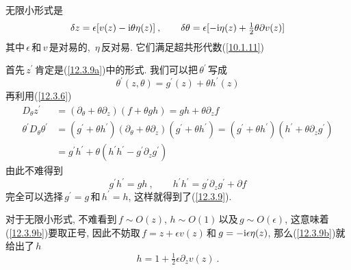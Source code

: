 无限小形式是
\begin{equation}
    \delta z= \epsilon[v(z)-\mathrm{i}\theta\eta(z)] \:, \qquad 
    \delta \theta =\epsilon[-\mathrm{i}\eta(z)+\tfrac{1}{2}\theta\partial v(z)]  \label{12.3.10}
\end{equation}
其中$\,\epsilon\,$和$\,v\,$是对易的, $\,\eta\,$反对易. 它们满足超共形代数(\ref{10.1.11})
\begin{tcolorbox}
首先$\,z^{\prime}\,$肯定是(\ref{12.3.9a})中的形式. 我们可以把$\,\theta^{\prime}\,$写成
\[
\theta^{\prime}(z,\theta)=g^{\prime}(z)+\theta h^{\prime}(z)
\]
再利用(\ref{12.3.6})
\begin{align*}
    D_{\theta}z^{\prime} &= (\partial_{\theta}+\theta\partial_{z})(f+\theta gh)= gh+\theta \partial_{z} f \\
    \theta^{\prime}D_{\theta}\theta^{\prime} &=(g^{\prime}+\theta h^{\prime})(\partial_{\theta}+\theta\partial_{z})
    (g^{\prime}+\theta h^{\prime})
    =(g^{\prime}+\theta h^{\prime})(h^{\prime}+\theta \partial_{z} g^{\prime}) \\
    &=g^{\prime}h^{\prime}+\theta (h^{\prime}h^{\prime}-g^{\prime}\partial_{z} g^{\prime})
\end{align*}
由此不难得到
\[
g^{\prime}h^{\prime}=gh \:, \qquad h^{\prime}h^{\prime}=g^{\prime}\partial_{z} g^{\prime}+\partial f 
\]
完全可以选择$\,g^{\prime}=g\,$和$\,h^{\prime}=h$, 这样就得到了(\ref{12.3.9}).

对于无限小形式, 不难看到$\,f\sim O(z)$, $h\sim O(1)\,$以及$\,g\sim O(\epsilon)$, 这意味着(\ref{12.3.9b})要取正号, 因此不妨取$\,f=z+\epsilon v(z)\,$和$\,g=-\mathrm{i}\epsilon\eta(z) $, 那么(\ref{12.3.9b})就给出了$\,h$
\[
h=1+\tfrac{1}{2}\epsilon\partial_{z}v(z) \:.
\]
\end{tcolorbox}


